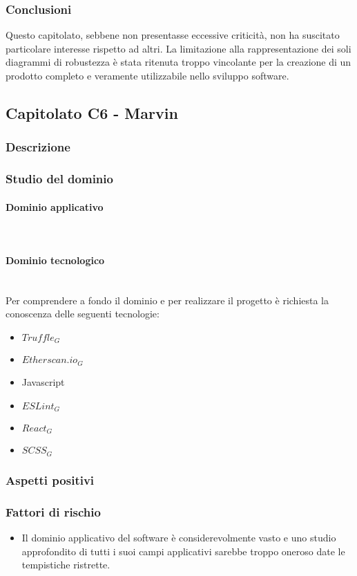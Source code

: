 		\subsubsection{Conclusioni}
		Questo capitolato, sebbene non presentasse eccessive criticità, non ha suscitato particolare interesse rispetto ad altri. La limitazione alla rappresentazione dei soli diagrammi di robustezza è stata ritenuta troppo vincolante per la creazione di un prodotto completo e veramente utilizzabile nello sviluppo software.
		
		
	\subsection{Capitolato C6 - Marvin}
		\subsubsection{Descrizione}
		\subsubsection{Studio del dominio}
			\paragraph{Dominio applicativo}
			\mbox{}\\
			\paragraph{Dominio tecnologico}
			\mbox{}\\
			Per comprendere a fondo il dominio e per realizzare il progetto è richiesta la conoscenza delle seguenti tecnologie:
			\begin{itemize}
				\item $Truffle_G$
				\item $Etherscan.io_G$
				\item Javascript
				\item $ESLint_G$
				\item $React_G$
				\item $SCSS_G$
			\end{itemize}
		\subsubsection{Aspetti positivi}
		\subsubsection{Fattori di rischio}
		\begin{itemize}
			\item Il dominio applicativo del software è considerevolmente vasto e uno studio approfondito di tutti i suoi campi applicativi sarebbe troppo oneroso date le tempistiche ristrette.
		\end{itemize}
